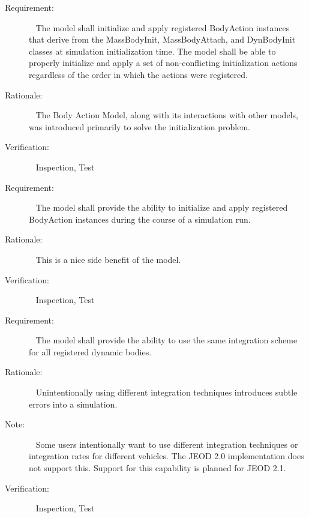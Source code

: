 \label{reqt:init_time_body_actions}
\begin{description}
\item[Requirement:]\ \newline
  \label{reqt:init_time_body_action_classes}
  The model shall initialize and apply registered BodyAction instances that
  derive from the MassBodyInit, MassBodyAttach, and DynBodyInit classes
  at simulation initialization time.
  \label{reqt:init_time_body_actions_order}
  The model shall be able to properly initialize and apply a set of
  non-conflicting initialization actions regardless of the order in
  which the actions were registered.
\item[Rationale:]\ \newline
  The Body Action Model, along with its interactions with other models,
  was introduced primarily to solve the initialization problem.
\item[Verification:]\ \newline
  Inspection, Test
\end{description}

\label{reqt:asynch_body_actions}
\begin{description}
\item[Requirement:]\ \newline
  The model shall provide the ability to initialize and apply registered
  BodyAction instances during the course of a simulation run.
\item[Rationale:]\ \newline
  This is a nice side benefit of the model.
\item[Verification:]\ \newline
  Inspection, Test
\end{description}

\label{reqt:common_integ}
\begin{description}
\item[Requirement:]\ \newline
  The model shall provide the ability to use the same integration scheme
  for all registered dynamic bodies.
\item[Rationale:]\ \newline
  Unintentionally using different integration techniques introduces
  subtle errors into a simulation.
\item[Note:]\ \newline
  Some users intentionally want to use different integration techniques or
  integration rates for different vehicles.
  The JEOD 2.0 implementation does not support this.
  Support for this capability is planned for JEOD 2.1.
\item[Verification:]\ \newline
  Inspection, Test
\end{description}

